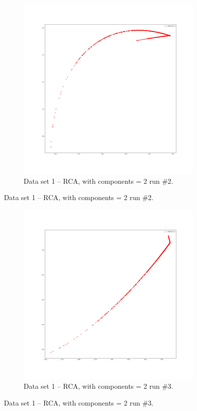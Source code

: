 \documentclass[
letterpaper, %
]{IEEEtran}
\begin{document}
	\begin{figure}[ht]\ContinuedFloat
		\begin{subfigure}{.5\textwidth}
			\centering
			\includegraphics[width=\linewidth]{./images/ds1/rca/scatter/run2.png}
			\caption{Data set 1 -- RCA, with components = 2 run \#2.}
			\label{fig:rcarun2}
		\end{subfigure}
	\end{figure}
	\begin{figure}[ht]\ContinuedFloat
		\begin{subfigure}{.5\textwidth}
			\centering
			\includegraphics[width=\linewidth]{./images/ds1/rca/scatter/run3.png}
			\caption{Data set 1 -- RCA, with components = 2 run \#3.}
			\label{fig:rcarun3}
		\end{subfigure}
	\end{figure}
\end{document}
